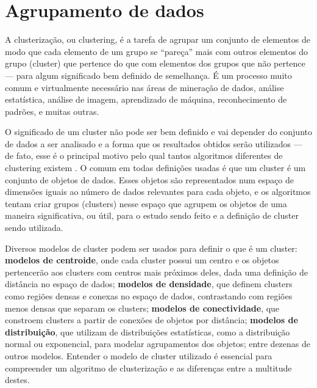 \documentclass[12pt, %
openright, 
oneside, %
a4paper,    %
brazil]{facom-ufu-abntex2}
\begin{document}

\section{Agrupamento de dados}

A clusterização, ou clustering, é a tarefa de agrupar um conjunto de elementos de modo que cada elemento de um grupo se \enquote{pareça} mais com outros elementos do grupo (cluster) que pertence do que com elementos dos grupos que não pertence --- para algum significado bem definido de semelhança. É um processo muito comum e virtualmente necessário nas áreas de mineração de dados, análise estatística, análise de imagem, aprendizado de máquina, reconhecimento de padrões, e muitas outras.

O significado de um cluster não pode ser bem definido e vai depender do conjunto de dados a ser analisado e a forma que os resultados obtidos serão utilizados --- de fato, esse é o principal motivo pelo qual tantos algoritmos diferentes de clustering existem \cite{SoManyClustAlg}. O comum em todas definições usadas é que um cluster é um conjunto de objetos de dados. Esses objetos são representados num espaço de dimensões iguais ao número de dados relevantes para cada objeto, e os algoritmos tentam criar grupos (clusters) nesse espaço que agrupem os objetos de uma maneira significativa, ou útil, para o estudo sendo feito e a definição de cluster sendo utilizada.


Diversos modelos de cluster podem ser usados para definir o que é um cluster: \textbf{modelos de centroide}, onde cada cluster possui um centro e os objetos pertencerão aos clusters com centros mais próximos deles, dada uma definição de distância no espaço de dados; \textbf{modelos de densidade}, que definem clusters como regiões densas e conexas no espaço de dados, contrastando com regiões menos densas que separam os clusters; \textbf{modelos de conectividade}, que constroem clusters a partir de conexões de objetos por distância; \textbf{modelos de distribuição}, que utilizam de distribuições estatísticas, como a distribuição normal ou exponencial, para modelar agrupamentos dos objetos; entre dezenas de outros modelos. Entender o modelo de cluster utilizado é essencial para compreender um algoritmo de clusterização e as diferenças entre a multitude destes.
\end{document}
